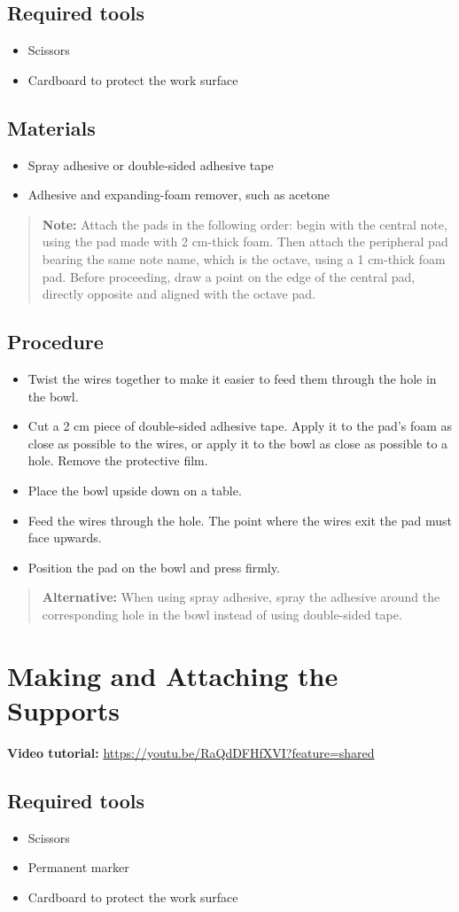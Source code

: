 \documentclass[11pt,a4paper]{article}
\newcommand{\tutorial}[1]{\textbf{Video tutorial:} \url{#1}}
\newcommand{\tools}{\subsection{Required tools}}
\newcommand{\materials}{\subsection{Materials}}
\newcommand{\procedure}{\subsection{Procedure}}
\newcommand{\note}[1]{\begin{quote}\textbf{Note:} #1\end{quote}}
\newcommand{\alternative}[1]{\begin{quote}\textbf{Alternative:} #1\end{quote}}
\begin{document}
\tools
\begin{itemize}
  \item Scissors
  \item Cardboard to protect the work surface
\end{itemize}

\materials
\begin{itemize}
  \item Spray adhesive or double-sided adhesive tape
  \item Adhesive and expanding-foam remover, such as acetone
\end{itemize}

\note{Attach the pads in the following order: begin with the central note, using the pad made with 2 cm-thick foam. Then attach the peripheral pad bearing the same note name, which is the octave, using a 1 cm-thick foam pad. Before proceeding, draw a point on the edge of the central pad, directly opposite and aligned with the octave pad.}

\procedure
\begin{itemize}
  \item Twist the wires together to make it easier to feed them through the hole in the bowl.
  \item Cut a 2 cm piece of double-sided adhesive tape. Apply it to the pad's foam as close as possible to the wires, or apply it to the bowl as close as possible to a hole. Remove the protective film.
  \item Place the bowl upside down on a table.
  \item Feed the wires through the hole. The point where the wires exit the pad must face upwards.
  \item Position the pad on the bowl and press firmly.
\end{itemize}

\alternative{When using spray adhesive, spray the adhesive around the corresponding hole in the bowl instead of using double-sided tape.}

\section{Making and Attaching the Supports}
\tutorial{https://youtu.be/RaQdDFHfXVI?feature=shared}

\tools
\begin{itemize}
  \item Scissors
  \item Permanent marker
  \item Cardboard to protect the work surface
\end{itemize}
\end{document}
